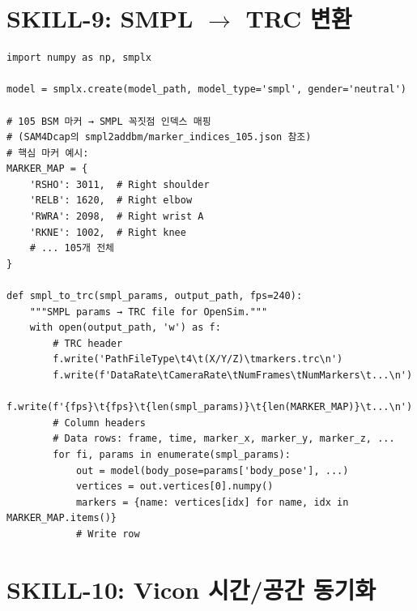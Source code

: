 \documentclass[11pt, a4paper]{report}
\begin{document}
\section{SKILL-9: SMPL $\to$ TRC 변환}

\begin{codebox}[title={105마커 BSM 매핑 (SAM4Dcap 참조)}]
\begin{verbatim}
import numpy as np, smplx

model = smplx.create(model_path, model_type='smpl', gender='neutral')

# 105 BSM 마커 → SMPL 꼭짓점 인덱스 매핑
# (SAM4Dcap의 smpl2addbm/marker_indices_105.json 참조)
# 핵심 마커 예시:
MARKER_MAP = {
    'RSHO': 3011,  # Right shoulder
    'RELB': 1620,  # Right elbow
    'RWRA': 2098,  # Right wrist A
    'RKNE': 1002,  # Right knee
    # ... 105개 전체
}

def smpl_to_trc(smpl_params, output_path, fps=240):
    """SMPL params → TRC file for OpenSim."""
    with open(output_path, 'w') as f:
        # TRC header
        f.write('PathFileType\t4\t(X/Y/Z)\tmarkers.trc\n')
        f.write(f'DataRate\tCameraRate\tNumFrames\tNumMarkers\t...\n')
        f.write(f'{fps}\t{fps}\t{len(smpl_params)}\t{len(MARKER_MAP)}\t...\n')
        # Column headers
        # Data rows: frame, time, marker_x, marker_y, marker_z, ...
        for fi, params in enumerate(smpl_params):
            out = model(body_pose=params['body_pose'], ...)
            vertices = out.vertices[0].numpy()
            markers = {name: vertices[idx] for name, idx in MARKER_MAP.items()}
            # Write row
\end{verbatim}
\end{codebox}


\section{SKILL-10: Vicon 시간/공간 동기화}
\end{document}

